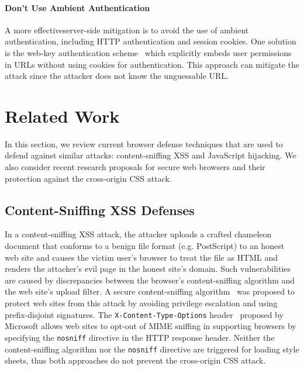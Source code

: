 \documentclass{acm_proc_article-sp}
\begin{document}
\paragraph{Don't Use Ambient Authentication}
A more effective\linebreak server-side mitigation is to avoid the use of ambient authentication, including HTTP authentication and session cookies. One solution is the web-key authentication scheme~\cite{webkey} which explicitly embeds user permissions in URLs without using cookies for authentication. This approach can mitigate the attack since the attacker does not know the unguessable URL.

\section{Related Work} \label{sec:relatedwork}
In this section, we review current browser defense techniques that are used to
defend against similar attacks: content-sniffing XSS and JavaScript hijacking.
We also consider recent research proposals for secure web browsers and their
protection against the cross-origin CSS attack.

\subsection{Content-Sniffing XSS Defenses}
In a content-sniffing XSS attack, the attacker uploads a crafted chameleon
document that conforms to a benign file format (e.g. PostScript) to an honest
web site and causes the victim user's browser to treat the file as HTML and
renders the attacker's evil page in the honest site's domain. Such
vulnerabilities are caused by discrepancies between the browser's
content-sniffing algorithm and the web site's upload filter. A secure
content-sniffing algorithm~\cite{securecontentsniffing} was proposed to
protect web sites from this attack by avoiding privilege escalation and using
prefix-disjoint signatures. The \texttt{X-Content-Type-Options}
header~\cite{nosniff} proposed by Microsoft allows web sites to opt-out of
MIME sniffing in supporting browsers by specifying the \texttt{nosniff}
directive in the HTTP response header. Neither the content-sniffing algorithm
nor the \texttt{nosniff} directive are triggered for loading style sheets,
thus both approaches do not prevent the cross-origin CSS attack.
\end{document}
